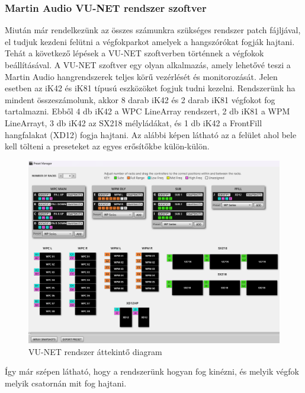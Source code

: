 \subsubsection{Martin Audio VU-NET rendszer szoftver \cite{VUNETUSERGUIDE}}
Miután már rendelkezünk az összes számunkra szükséges rendszer patch fájljával,
el tudjuk kezdeni felütni a végfokparkot amelyek a hangszórókat fogják hajtani.
Tehát a következő lépések a VU-NET szoftverben történnek a végfokok beállításával.
A VU-NET szoftver egy olyan alkalmazás, amely lehetővé teszi a Martin Audio hangrendszerek teljes körű vezérlését és monitorozását.
Jelen esetben az iK42 és iK81 típusú eszközöket fogjuk tudni kezelni.
Rendszerünk ha mindent összeszámolunk, akkor 8 darab iK42 és 2 darab iK81 végfokot fog tartalmazni.
Ebből 4 db iK42 a WPC LineArray rendszert, 2 db iK81 a WPM LineArrayt, 3 db iK42
az SX218 mélyládákat, és 1 db iK42 a FrontFill hangfalakat (XD12) fogja hajtani.
Az alábbi képen látható az a felület ahol bele kell tölteni a preseteket az egyes erősítőkbe külön-külön.
\begin{figure}[H]
	\centering
	\includegraphics[width=\textwidth, keepaspectratio]{figures/vunet_systemdiagram_overall.png}
	\caption{VU-NET rendszer áttekintő diagram}\label{fig:vunet_systemdiagram_overall}
\end{figure}
Így már szépen látható, hogy a rendszerünk hogyan fog kinézni, és melyik végfok melyik csatornán mit fog hajtani.
